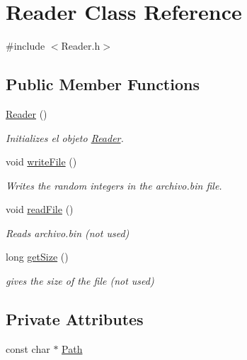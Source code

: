\hypertarget{classReader}{}\section{Reader Class Reference}
\label{classReader}


{\ttfamily \#include $<$Reader.\+h$>$}

\subsection*{Public Member Functions}
\begin{DoxyCompactItemize}
\item 
\mbox{\hyperlink{classReader_adcda31b507720ab44044d7a21686fba2}{Reader}} ()
\begin{DoxyCompactList}\small\item\em Initializes el objeto \mbox{\hyperlink{classReader}{Reader}}. \end{DoxyCompactList}\item 
void \mbox{\hyperlink{classReader_ab6cd23c1911a1b7dfb452659fef4a6d4}{write\+File}} ()
\begin{DoxyCompactList}\small\item\em Writes the random integers in the archivo.\+bin file. \end{DoxyCompactList}\item 
void \mbox{\hyperlink{classReader_ab8c747ff4741efb08203f80013d391d6}{read\+File}} ()
\begin{DoxyCompactList}\small\item\em Reads archivo.\+bin (not used) \end{DoxyCompactList}\item 
long \mbox{\hyperlink{classReader_aeaafb1c474105dd5fed7bdbdefe1c0a7}{get\+Size}} ()
\begin{DoxyCompactList}\small\item\em gives the size of the file (not used) \end{DoxyCompactList}\end{DoxyCompactItemize}
\subsection*{Private Attributes}
\begin{DoxyCompactItemize}
\item 
const char $\ast$ \mbox{\hyperlink{classReader_ab5f068fab65032809f1bbd13c9ff6cc4}{Path}}
\end{DoxyCompactItemize}


